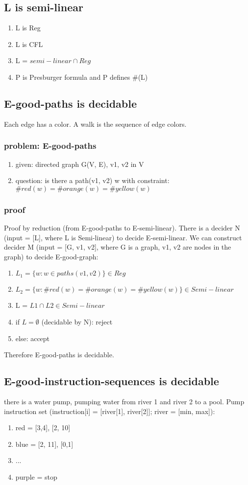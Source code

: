 \documentclass{article}
\begin{document}
\subsection{L is semi-linear}
\begin{enumerate}
	\item L is Reg
	\item L is CFL
	\item L = $ semi-linear \cap Reg $
	\item P is Presburger formula and P defines \#(L)
\end{enumerate}

\subsection{E-good-paths is decidable}
Each edge has a color.
A walk is the sequence of edge colors.
\subsubsection{problem: E-good-paths}
\begin{enumerate}
	\item given: directed graph G(V, E), v1, v2 in V
	\item question: is there a path(v1, v2) w with constraint: $ \#red(w) = 
	\#orange(w) = \#yellow(w) $
\end{enumerate}

\subsubsection{proof}
Proof by reduction (from E-good-paths to E-semi-linear).
There is a decider N (input = [L], where L is Semi-linear) to decide 
E-semi-linear.
We can construct decider M (input = [G, v1, v2], where G is a graph, v1, v2 are 
nodes in the graph) to decide E-good-graph:
\begin{enumerate}
	\item $ L_1 = \{w: w \in paths(v1, v2)\} \in Reg $
	\item $ L_2 = \{w: \#red(w) = \#orange(w) = \#yellow(w) \} \in Semi-linear $
	\item L = $ L1 \cap L2 \in Semi-linear $
	\item if $ L = \emptyset $ (decidable by N): reject
	\item else: accept
\end{enumerate}
Therefore E-good-paths is decidable.

\subsection{E-good-instruction-sequences is decidable}
there is a water pump, pumping water from river 1 and river 2 to a pool.
Pump instruction set (instruction[i] = [river[1], river[2]]; river = [min, 
max]):
\begin{enumerate}
	\item red = [3,4], [2, 10]
	\item blue = [2, 11], [0,1]
	\item ...
	\item purple = stop	
\end{enumerate}
\end{document}
